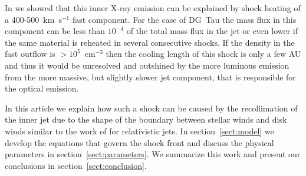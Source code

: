 In \citet{2009A&A...493..579G} we showed that this inner X-ray emission can be explained by shock heating of a 400-500~km~s$^{-1}$ fast component. For the case of DG~Tau the mass flux in this component can be less than $10^{-4}$ of the total mass flux in the jet or even lower if the same material is reheated in several consecutive shocks. If the density in the fast outflow is $>10^5$~cm$^{-3}$ then the cooling length of this shock is only a few AU and thus it would be unresolved and outshined by the more luminous emission from the more massive, but slightly slower jet component, that is responsible for the optical emission.

In this article we explain how such a shock can be caused by the recollimation of the inner jet due to the shape of the boundary between stellar winds and disk winds similar to the work of \citet{2012MNRAS.422.2282K} for relativistic jets. In section~\ref{sect:model} we develop the equations that govern the shock front and discuss the physical parameters in section~\ref{sect:parameters}. We summarize this work and present our conclusions in section~\ref{sect:conclusion}.